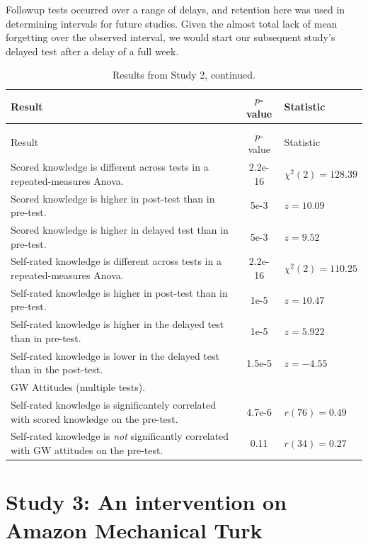 Followup tests occurred over a range of
delays, and retention here was used in determining intervals for future studies.
Given the almost total lack of mean forgetting over the observed interval, we
would start our subsequent study's delayed test after a delay of a full week.

\begin{longtabu}{X[2.5]S[table-parse-only]X[l]}

\caption{Summary of results from Study 2.\label{table:RPP-mech-results}}\\ 
\toprule
Result & {$p$-value} & Statistic \\ \midrule
\endfirsthead

\caption[]{Results from Study 2, continued.}\\
\toprule
Result & {$p$-value} & Statistic \\ \midrule
\endhead

\bottomrule
\endfoot

Scored knowledge is different across tests in a repeated-measures Anova. &
2.2e-16 & $\chi^2(2)=128.39$  \\
Scored knowledge is higher in post-test than in pre-test. & 5e-3 & $z=10.09$ \\
Scored knowledge is higher in delayed test than in pre-test. & 5e-3 & $z=9.52$ \\
Self-rated knowledge is different across tests in a repeated-measures Anova. &
2.2e-16 & $\chi^2(2)=110.25$ \\
Self-rated knowledge is higher in post-test than in pre-test. & 1e-5 & $z=10.47$ \\
Self-rated knowledge is higher in the delayed test than in pre-test. & 1e-5 &
$z=5.922$ \\
Self-rated knowledge is lower in the delayed test than in the post-test. &
1.5e-5 & $z=-4.55$ \\
GW Attitudes (multiple tests). \\
Self-rated knowledge is significantely correlated with scored knowledge on the
pre-test. & 4.7e-6 & $r(76)=0.49$ \\
Self-rated knowledge is \emph{not} significantly correlated with GW attitudes on
the pre-test. & 0.11 & $r(34)=0.27$ \\

\end{longtabu}

\section{Study 3: An intervention on Amazon Mechanical Turk}

